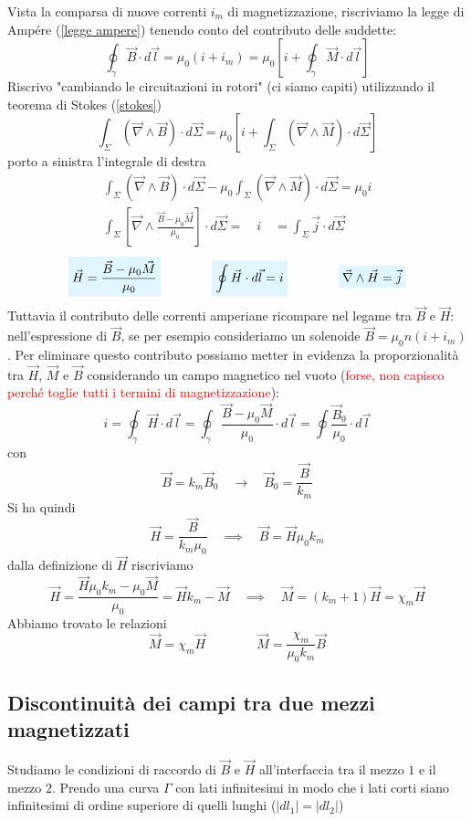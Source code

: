 \documentclass[x11names]{report}
\begin{document}
Vista la comparsa di nuove correnti \(i_m\) di magnetizzazione, riscriviamo la legge di Ampére (\ref{legge ampere}) tenendo conto del contributo delle suddette:
\[
\oint_\gamma \vec{B}\cdot d\vec{l} = \mu_0(i+i_m) = \mu_0\left[i + \oint_\gamma \vec{M}\cdot d\vec{l}\right]
\]
Riscrivo "cambiando le circuitazioni in rotori" (ci siamo capiti) utilizzando il teorema di Stokes (\ref{stokes}) 
\[
\int_\Sigma \left(\vec{\nabla}\wedge\vec{B}\right)\cdot d\vec{\Sigma}  =  \mu_0\left[i + \int_\Sigma\left(\vec{\nabla}\wedge\vec{M}\right)\cdot d\vec{\Sigma}\right]
\]
porto a sinistra l'integrale di destra 
\begin{gather*}
	\int_\Sigma \left(\vec{\nabla}\wedge\vec{B}\right)\cdot d\vec{\Sigma} - \mu_0\int_\Sigma\left(\vec{\nabla}\wedge\vec{M}\right)\cdot d\vec{\Sigma} = \mu_0 i \\
	\int_\Sigma \left[\vec{\nabla}\wedge \frac{\vec{B}-\mu_0\vec{M}}{\mu_0}\right] \cdot d\vec{\Sigma} = \quad i \quad = \int_\Sigma \vec{j} \cdot d\vec{\Sigma}
\end{gather*}
\begin{equation}
		\viola{\vec{H} = \frac{\vec{B}-\mu_0\vec{M}}{\mu_0}} \qquad \qquad \viola{\oint \vec{H} \cdot d\vec{l} = i} \qquad \qquad \viola{\vec{\nabla} \wedge \vec{H} = \vec{j}}
\end{equation}
Tuttavia il contributo delle correnti amperiane ricompare nel legame tra \(\vec{B}\) e \(\vec{H}\): nell'espressione di \(\vec{B}\), se per esempio consideriamo un solenoide \(\vec{B} = \mu_0n(i + i_m)\). Per eliminare questo contributo possiamo metter in evidenza la proporzionalità tra \(\vec{H}\), \(\vec{M}\) e \(\vec{B}\) considerando un campo magnetico nel vuoto (\textcolor{red}{forse, non capisco perché toglie tutti i termini di magnetizzazione}):
\[
i = \oint_\gamma \vec{H} \cdot d\vec{l} = \oint_\gamma \frac{\vec{B} - \mu_0 \vec{M}}{\mu_0} \cdot d\vec{l} = \oint \frac{\vec{B}_0}{\mu_0} \cdot d\vec{l}
\]
con 
\[
\vec{B} = k_m\vec{B}_0  \quad \to \quad \vec{B}_0 = \frac{\vec{B}}{k_m}
\]
Si ha quindi
\[
\vec{H} = \frac{\vec{B}}{k_m\mu_0} \quad \implies \quad \boxed{\vec{B} = \vec{H}\mu_0 k_m}
\]
dalla definizione di \(\vec{H}\) riscriviamo
\[
\vec{H} = \frac{\vec{H}\mu_0 k_m - \mu_0 \vec{M}}{\mu_0} = \vec{H} k_m - \vec{M} \quad \implies \quad \vec{M} = (k_m + 1)\vec{H} = \chi_m \vec{H}
\]
Abbiamo trovato le relazioni
\[
\boxed{\vec{M} = \chi_m \vec{H}} \qquad \qquad\boxed{\vec{M} = \frac{\chi_m}{\mu_0 k_m}\vec{B}}
\]

\subsection{Discontinuità dei campi tra due mezzi magnetizzati}
Studiamo le condizioni di raccordo di \(\vec{B}\) e \(\vec{H}\) all'interfaccia tra il mezzo \(1\) e il mezzo \(2\). Prendo una curva \(\Gamma\) con lati infinitesimi in modo che i lati corti siano infinitesimi di ordine superiore di quelli lunghi (\(|dl_1| = |dl_2|\))
\end{document}
